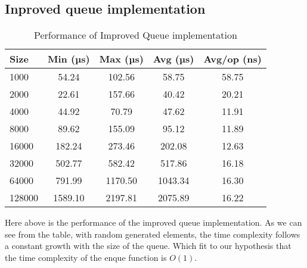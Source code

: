 \subsection*{Inproved queue implementation}
\begin{table}[h]
    \centering
    \begin{tabular}{|l|c|c|c|c|}
    \hline
    \textbf{Size} & \textbf{Min (µs)} & \textbf{Max (µs)} & \textbf{Avg (µs)} & \textbf{Avg/op (ns)} \\
    \hline
    1000 & 54.24 & 102.56 & 58.75 & 58.75 \\
    2000 & 22.61 & 157.66 & 40.42 & 20.21 \\
    4000 & 44.92 & 70.79 & 47.62 & 11.91 \\
    8000 & 89.62 & 155.09 & 95.12 & 11.89 \\
    16000 & 182.24 & 273.46 & 202.08 & 12.63 \\
    32000 & 502.77 & 582.42 & 517.86 & 16.18 \\
    64000 & 791.99 & 1170.50 & 1043.34 & 16.30 \\
    128000 & 1589.10 & 2197.81 & 2075.89 & 16.22 \\
    \hline
    \end{tabular}
    \caption{Performance of Improved Queue implementation}
    \label{tab:improved_queue_perf}
\end{table}
Here above is the performance of the improved queue implementation. As we can see from the table, with random generated elements, the time complexity follows a constant growth with the size of the queue. Which fit to our hypothesis that the time complexity of the enque function is $O(1)$.

